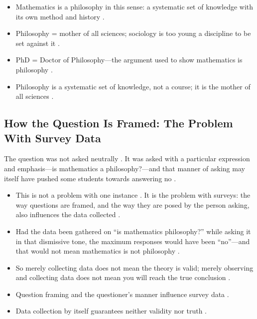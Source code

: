 \begin{KeyConcept}
\begin{itemize}
    \item Mathematics is a philosophy in this sense: a systematic set of knowledge with its own method and history .
    \item Philosophy = mother of all sciences; sociology is too young a discipline to be set against it .
\end{itemize}
\end{KeyConcept}

\begin{QuickRevision}
\begin{itemize}
    \item PhD = Doctor of Philosophy---the argument used to show mathematics is philosophy .
    \item Philosophy is a systematic set of knowledge, not a course; it is the mother of all sciences .
\end{itemize}
\end{QuickRevision}

\subsection{How the Question Is Framed: The Problem With Survey Data}
The question was not asked neutrally . It was asked with a particular expression and emphasis---is mathematics a philosophy?---and that manner of asking may itself have pushed some students towards answering no .

\begin{CriticalPoint}
\begin{itemize}
    \item This is not a problem with one instance . It is the problem with surveys: the way questions are framed, and the way they are posed by the person asking, also influences the data collected .
    \item Had the data been gathered on ``is mathematics philosophy?'' while asking it in that dismissive tone, the maximum responses would have been ``no''---and that would not mean mathematics is not philosophy .
    \item So merely collecting data does not mean the theory is valid; merely observing and collecting data does not mean you will reach the true conclusion .
\end{itemize}
\end{CriticalPoint}

\begin{QuickRevision}
\begin{itemize}
    \item Question framing and the questioner's manner influence survey data .
    \item Data collection by itself guarantees neither validity nor truth .
\end{itemize}
\end{QuickRevision}

